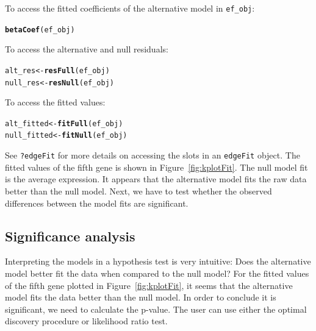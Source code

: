 \documentclass{article}\usepackage[]{graphicx}\usepackage[]{color}
\makeatletter
\newcommand{\hlstd}[1]{\textcolor[rgb]{0.345,0.345,0.345}{#1}}%
\newcommand{\hlkwb}[1]{\textcolor[rgb]{0.69,0.353,0.396}{#1}}%
\newcommand{\hlkwd}[1]{\textcolor[rgb]{0.737,0.353,0.396}{\textbf{#1}}}%
\newenvironment{kframe}{%
 \def\at@end@of@kframe{}%
 \ifinner\ifhmode%
  \def\at@end@of@kframe{\end{minipage}}%
  \begin{minipage}{\columnwidth}%
 \fi\fi%
 \def\FrameCommand##1{\hskip\@totalleftmargin \hskip-\fboxsep
 \colorbox{shadecolor}{##1}\hskip-\fboxsep
     \hskip-\linewidth \hskip-\@totalleftmargin \hskip\columnwidth}%
 \MakeFramed {\advance\hsize-\width
   \@totalleftmargin\z@ \linewidth\hsize
   \@setminipage}}%
 {\par\unskip\endMakeFramed%
 \at@end@of@kframe}
\newenvironment{knitrout}{}{} %
\makeatother
\begin{document}
To access the fitted coefficients of the alternative model in {\tt ef\_obj}:
\begin{knitrout}
\color{fgcolor}\begin{kframe}
\begin{alltt}
\hlkwd{betaCoef}\hlstd{(ef_obj)}
\end{alltt}
\end{kframe}
\end{knitrout}
To access the alternative and null residuals:
\begin{knitrout}
\color{fgcolor}\begin{kframe}
\begin{alltt}
\hlstd{alt_res} \hlkwb{<-} \hlkwd{resFull}\hlstd{(ef_obj)}
\hlstd{null_res} \hlkwb{<-} \hlkwd{resNull}\hlstd{(ef_obj)}
\end{alltt}
\end{kframe}
\end{knitrout}
To access the fitted values:
\begin{knitrout}
\color{fgcolor}\begin{kframe}
\begin{alltt}
\hlstd{alt_fitted} \hlkwb{<-} \hlkwd{fitFull}\hlstd{(ef_obj)}
\hlstd{null_fitted} \hlkwb{<-} \hlkwd{fitNull}\hlstd{(ef_obj)}
\end{alltt}
\end{kframe}
\end{knitrout}

See {\tt ?edgeFit} for more details on accessing the slots in an {\tt edgeFit} object. The fitted values of the fifth gene is shown in Figure~\ref{fig:kplotFit}. The null model fit is the average expression. It appears that the alternative model fits the raw data better than the null model. Next, we have to test whether the observed differences between the model fits are significant.

\subsection{Significance analysis}
Interpreting the models in a hypothesis test is very intuitive: Does the alternative model better fit the data when compared to the null model? For the fitted values of the fifth gene plotted in Figure~\ref{fig:kplotFit}, it seems that the alternative model fits the data better than the null model. In order to conclude it is significant, we need to calculate the p-value. The user can use either the optimal discovery procedure or likelihood ratio test. 
\end{document}
